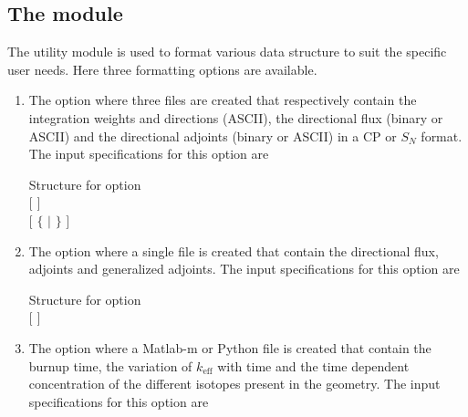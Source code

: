\subsection{The  module}\label{sect:FMTData}

The utility module  is used to format various data structure to suit the specific user needs.  Here three formatting options are available.
 \begin{enumerate}
\item The  option where three files are created that respectively contain the integration weights and directions (ASCII), the directional flux (binary or ASCII) and the
directional adjoints (binary or ASCII) in a CP or $S_{N}$ format.\cite{Kodeli2001a,Bidaud2009a} The input specifications for this option are  

\begin{DataStructure}{Structure  for  option}%
   \moc{:=}      \moc{::}\\ 
\hspace{1.0cm} $[$   $]$ \\
\hspace{1.0cm}  $[$ $\{$  $|$  $\}$ $]$
\end{DataStructure}

\item The  option where a single file is created that contain the directional flux, adjoints and generalized adjoints. The input specifications for this option are

\begin{DataStructure}{Structure  for  option}%
 \moc{:=}      \moc{::} \\ 
\hspace{1.0cm} $[$   $]$ \\
\hspace{1.0cm}  
\end{DataStructure}

\item The  option where a Matlab-m or Python file is created that contain the burnup time, the variation of $k_{\text{eff}}$ with time and the time dependent concentration of the different isotopes present in the geometry. The input specifications for this option are 


\end{enumerate}
